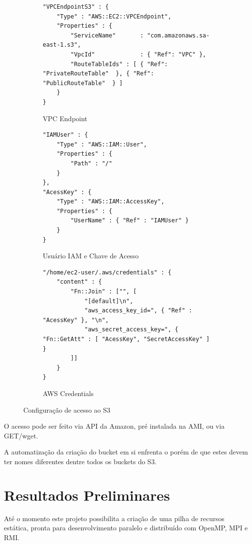 \documentclass[tg]{mdtufsm}
\begin{document}
\begin{figure}
\centering

\begin{subfigure}[c]{1\textwidth}
\begin{lstlisting}[frame=single, numbers=none]
"VPCEndpointS3" : {
	"Type" : "AWS::EC2::VPCEndpoint",
	"Properties" : {
		"ServiceName"		: "com.amazonaws.sa-east-1.s3",
		"VpcId"				: { "Ref": "VPC" },
		"RouteTableIds"	: [ { "Ref": "PrivateRouteTable"  }, { "Ref": "PublicRouteTable"  } ]
	}
}
\end{lstlisting}
\caption{VPC Endpoint}
\label{vpcEndpoint}
\end{subfigure}

\begin{subfigure}[c]{1\textwidth}
\begin{lstlisting}[frame=single, numbers=none]
"IAMUser" : {
	"Type" : "AWS::IAM::User",
	"Properties" : {
		"Path" : "/"
	}
},		
"AcessKey" : {
	"Type" : "AWS::IAM::AccessKey",
	"Properties" : {
		"UserName" : { "Ref" : "IAMUser" }
	}
} 
\end{lstlisting}
\caption{Usuário IAM e Chave de Acesso}
\label{accessKey}
\end{subfigure}

\begin{subfigure}[c]{1\textwidth}
\begin{lstlisting}[frame=single, numbers=none]
"/home/ec2-user/.aws/credentials" : {
	"content" : {
		"Fn::Join" : ["", [
			"[default]\n",
			"aws_access_key_id=", { "Ref" : "AcessKey" }, "\n",
			"aws_secret_access_key=", { "Fn::GetAtt" : [ "AcessKey", "SecretAccessKey" ] }					
		]]
	}
}
\end{lstlisting}
\caption{AWS Credentials}
\label{awsCredentials}
\end{subfigure}
\caption{Configuração de acesso ao S3}
\end{figure}

O acesso pode ser feito via API da Amazon, pré instalada na AMI, ou via GET/wget.

A automatização da criação do bucket em si enfrenta o porém de que estes devem ter nomes diferentes dentre todos os buckets do S3.


\chapter{Resultados Preliminares}

Até o momento este projeto possibilita a criação de uma pilha de recursos estática, pronta para desenvolvimento paralelo e distribuído com OpenMP, MPI e RMI.
\end{document}
